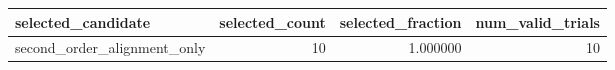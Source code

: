 \begin{tabular}{lrrr}
\toprule
selected_candidate & selected_count & selected_fraction & num_valid_trials \\
\midrule
second_order_alignment_only & 10 & 1.000000 & 10 \\
\bottomrule
\end{tabular}
